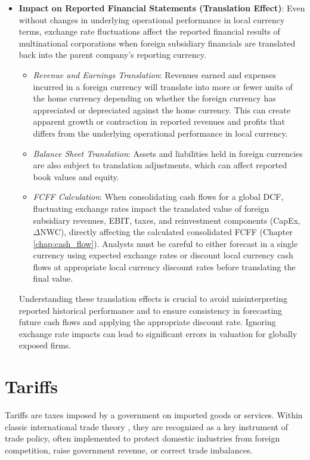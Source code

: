 \begin{itemize}
    \item \textbf{Impact on Reported Financial Statements (Translation Effect)}: Even without changes in underlying operational performance in local currency terms, exchange rate fluctuations affect the reported financial results of multinational corporations when foreign subsidiary financials are translated back into the parent company's reporting currency.
          \begin{itemize}
              \item \textit{Revenue and Earnings Translation}: Revenues earned and expenses incurred in a foreign currency will translate into more or fewer units of the home currency depending on whether the foreign currency has appreciated or depreciated against the home currency. This can create apparent growth or contraction in reported revenues and profits that differs from the underlying operational performance in local currency.
              \item \textit{Balance Sheet Translation}: Assets and liabilities held in foreign currencies are also subject to translation adjustments, which can affect reported book values and equity.
              \item \textit{FCFF Calculation}: When consolidating cash flows for a global DCF, fluctuating exchange rates impact the translated value of foreign subsidiary revenues, EBIT, taxes, and reinvestment components (CapEx, \(\Delta\)NWC), directly affecting the calculated consolidated FCFF (Chapter \ref{chap:cash_flow}). Analysts must be careful to either forecast in a single currency using expected exchange rates or discount local currency cash flows at appropriate local currency discount rates before translating the final value.
          \end{itemize}

          Understanding these translation effects is crucial to avoid misinterpreting reported historical performance and to ensure consistency in forecasting future cash flows and applying the appropriate discount rate. Ignoring exchange rate impacts can lead to significant errors in valuation for globally exposed firms.
\end{itemize}

\section{Tariffs} \label{sec:tariffs}

Tariffs are taxes imposed by a government on imported goods or services. Within classic international trade theory \parencite{krugman2022international, eun2020international}, they are recognized as a key instrument of trade policy, often implemented to protect domestic industries from foreign competition, raise government revenue, or correct trade imbalances.

